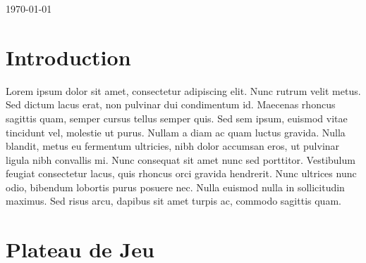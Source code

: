\documentclass[11pt]{article}
\begin{document}
\begin{titlepage}
	
	
	\vfill\vfill\vfill %
	
	{\large\today} %
	
	
	 
	
	\vfill %
	
\end{titlepage}
\newpage

\section{Introduction}

 Lorem ipsum dolor sit amet, consectetur adipiscing elit. Nunc rutrum velit metus. Sed dictum lacus erat, non pulvinar dui condimentum id. Maecenas rhoncus sagittis quam, semper cursus tellus semper quis. Sed sem ipsum, euismod vitae tincidunt vel, molestie ut purus. Nullam a diam ac quam luctus gravida. Nulla blandit, metus eu fermentum ultricies, nibh dolor accumsan eros, ut pulvinar ligula nibh convallis mi. Nunc consequat sit amet nunc sed porttitor. Vestibulum feugiat consectetur lacus, quis rhoncus orci gravida hendrerit. Nunc ultrices nunc odio, bibendum lobortis purus posuere nec. Nulla euismod nulla in sollicitudin maximus. Sed risus arcu, dapibus sit amet turpis ac, commodo sagittis quam.\\

\section{Plateau de Jeu}
\end{document}
